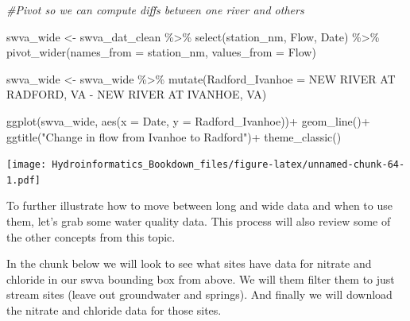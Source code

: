 \documentclass[
]{book}
\newenvironment{Shaded}{\begin{snugshade}}{\end{snugshade}}
\newcommand{\AttributeTok}[1]{\textcolor[rgb]{0.77,0.63,0.00}{#1}}
\newcommand{\CommentTok}[1]{\textcolor[rgb]{0.56,0.35,0.01}{\textit{#1}}}
\newcommand{\FunctionTok}[1]{\textcolor[rgb]{0.00,0.00,0.00}{#1}}
\newcommand{\NormalTok}[1]{#1}
\newcommand{\OtherTok}[1]{\textcolor[rgb]{0.56,0.35,0.01}{#1}}
\newcommand{\SpecialCharTok}[1]{\textcolor[rgb]{0.00,0.00,0.00}{#1}}
\newcommand{\StringTok}[1]{\textcolor[rgb]{0.31,0.60,0.02}{#1}}
\begin{document}
\begin{Shaded}
\begin{Highlighting}[]
\CommentTok{\#Pivot so we can compute diffs between one river and others}

\NormalTok{swva\_wide }\OtherTok{\textless{}{-}}\NormalTok{ swva\_dat\_clean }\SpecialCharTok{\%\textgreater{}\%} \FunctionTok{select}\NormalTok{(station\_nm, Flow, Date) }\SpecialCharTok{\%\textgreater{}\%}
  \FunctionTok{pivot\_wider}\NormalTok{(}\AttributeTok{names\_from =}\NormalTok{ station\_nm, }\AttributeTok{values\_from =}\NormalTok{ Flow)}

\NormalTok{swva\_wide }\OtherTok{\textless{}{-}}\NormalTok{ swva\_wide }\SpecialCharTok{\%\textgreater{}\%} \FunctionTok{mutate}\NormalTok{(}\AttributeTok{Radford\_Ivanhoe =} \StringTok{\textasciigrave{}}\AttributeTok{NEW RIVER AT RADFORD, VA}\StringTok{\textasciigrave{}} \SpecialCharTok{{-}} \StringTok{\textasciigrave{}}\AttributeTok{NEW RIVER AT IVANHOE, VA}\StringTok{\textasciigrave{}}\NormalTok{)}

\FunctionTok{ggplot}\NormalTok{(swva\_wide, }\FunctionTok{aes}\NormalTok{(}\AttributeTok{x =}\NormalTok{ Date, }\AttributeTok{y =}\NormalTok{ Radford\_Ivanhoe))}\SpecialCharTok{+}
  \FunctionTok{geom\_line}\NormalTok{()}\SpecialCharTok{+}
  \FunctionTok{ggtitle}\NormalTok{(}\StringTok{"Change in flow from Ivanhoe to Radford"}\NormalTok{)}\SpecialCharTok{+}
  \FunctionTok{theme\_classic}\NormalTok{()}
\end{Highlighting}
\end{Shaded}

\texttt{[image: Hydroinformatics\_Bookdown\_files/figure-latex/unnamed-chunk-64-1.pdf]}

To further illustrate how to move between long and wide data and when to use them, let's grab some water quality data. This process will also review some of the other concepts from this topic.

In the chunk below we will look to see what sites have data for nitrate and chloride in our swva bounding box from above. We will them filter them to just stream sites (leave out groundwater and springs). And finally we will download the nitrate and chloride data for those sites.
\end{document}
